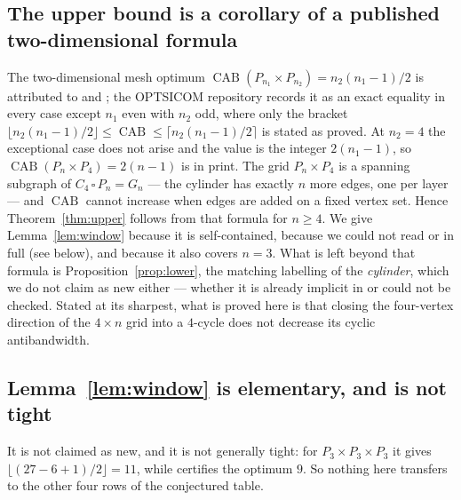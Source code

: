 \documentclass[11pt]{amsart}
\DeclareMathOperator{\CAB}{CAB}
\begin{document}
\subsection*{The upper bound is a corollary of a published two-dimensional formula}
The two-dimensional mesh optimum $\CAB(P_{n_1}\times P_{n_2}) = n_2(n_1-1)/2$ is attributed to
\cite{STV2005} and \cite{RSSTV2009}; the OPTSICOM repository \cite{Optsicom} records it as an exact
equality in every case except $n_1$ even with $n_2$ odd, where only the bracket
$\lfloor n_2(n_1-1)/2\rfloor\le\CAB\le\lceil n_2(n_1-1)/2\rceil$ is stated as proved. At $n_2 = 4$
the exceptional case does not arise and the value is the integer $2(n_1-1)$, so
$\CAB(P_n\times P_4) = 2(n-1)$ is in print.
The grid $P_n\times P_4$ is a spanning subgraph of $C_4\,\square\,P_n = G_n$ --- the cylinder has
exactly $n$ more edges, one per layer --- and $\CAB$ cannot increase when edges are added on a fixed
vertex set. Hence Theorem~\ref{thm:upper} follows from that formula for $n\ge4$. We give
Lemma~\ref{lem:window} because it is self-contained, because we could not read \cite{STV2005} or
\cite{RSSTV2009} in full (see below), and because it also covers $n=3$. What is left beyond
that formula is Proposition~\ref{prop:lower}, the matching labelling of the \emph{cylinder}, which
we do not claim as new either --- whether it is already implicit in \cite{STV2005} or
\cite{RSSTV2009} could not be checked. Stated at its
sharpest, what is proved here is that closing the four-vertex direction of the $4\times n$ grid
into a $4$-cycle does not decrease its cyclic antibandwidth.

\subsection*{Lemma~\ref{lem:window} is elementary, and is not tight}
It is not claimed as new, and it is not generally tight: for
$P_3\times P_3\times P_3$ it gives $\lfloor(27-6+1)/2\rfloor = 11$, while \cite{SAT2026} certifies
the optimum $9$. So nothing here transfers to the other four rows of the conjectured table.
\end{document}
